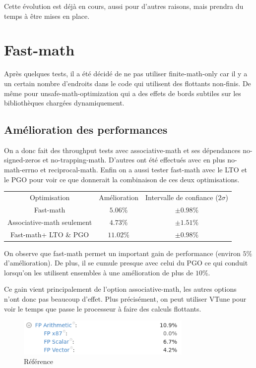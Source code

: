 \documentclass[a4paper,11pt]{report}
\begin{document}
Cette évolution est déjà en cours, aussi pour d'autres raisons, mais prendra du temps à être mises en place.

\section{Fast-math}
Après quelques tests, il a été décidé de ne pas utiliser finite-math-only car il y a un certain nombre d'endroits dans le code qui utilisent des flottants non-finis.
De même pour unsafe-math-optimization qui a des effets de bords subtiles sur les bibliothèques chargées dynamiquement.

\subsection{Amélioration des performances}
On a donc fait des throughput tests avec associative-math et ses dépendances no-signed-zeros et no-trapping-math.
D'autres ont été effectués avec en plus no-math-errno et reciprocal-math.
Enfin on a aussi tester fast-math avec le LTO et le PGO pour voir ce que donnerait la combinaison de ces deux optimisations.
\begin{center}
    \begin{tabular}{ c c c }
        Optimisation                           & Amélioration & Intervalle de confiance ($2\sigma$) \\
        Fast-math\footnotemark[1]              & $5.06\%$     & $\pm 0.98\%$                        \\
        Associative-math seulement             & $4.73\%$     & $\pm 1.51\%$                        \\
        Fast-math\footnotemark[1] + LTO \& PGO & $11.02\%$    & $\pm 0.98\%$
    \end{tabular}
\end{center}

On observe que fast-math permet un important gain de performance (environ $5\%$ d'amélioration).
De plus, il se cumule presque avec celui du PGO ce qui conduit lorsqu'on les utilisent ensembles à une amélioration de plus de $10\%$.

Ce gain vient principalement de l'option associative-math, les autres options n'ont donc pas beaucoup d'effet.
Plus précisément, on peut utiliser VTune pour voir le temps que passe le processeur à faire des calculs flottants.

\begin{figure}[H]
    \includegraphics[width=0.75\textwidth, center]{reference_vtune.png}
    \caption{Référence}
    \label{reference_vtune}
\end{figure}
\end{document}
